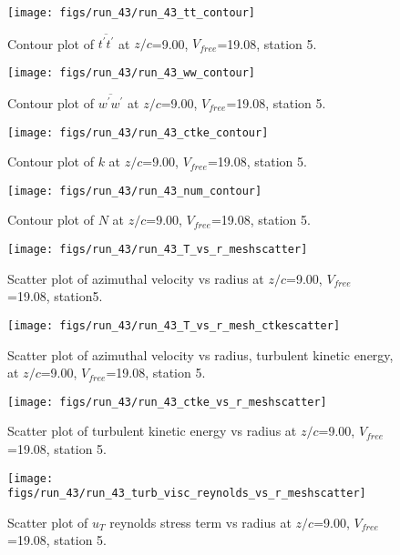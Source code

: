 \begin{figure}[H]
\centering
\texttt{[image: figs/run\_43/run\_43\_tt\_contour]}
\caption{Contour plot of $\overline{t^\prime t^\prime}$ at $z/c$=9.00, $V_{free}$=19.08, station 5.}
\end{figure}


\begin{figure}[H]
\centering
\texttt{[image: figs/run\_43/run\_43\_ww\_contour]}
\caption{Contour plot of $\overline{w^\prime w^\prime}$ at $z/c$=9.00, $V_{free}$=19.08, station 5.}
\end{figure}


\begin{figure}[H]
\centering
\texttt{[image: figs/run\_43/run\_43\_ctke\_contour]}
\caption{Contour plot of $k$ at $z/c$=9.00, $V_{free}$=19.08, station 5.}
\end{figure}


\begin{figure}[H]
\centering
\texttt{[image: figs/run\_43/run\_43\_num\_contour]}
\caption{Contour plot of $N$ at $z/c$=9.00, $V_{free}$=19.08, station 5.}
\end{figure}


\begin{figure}[H]
\centering
\texttt{[image: figs/run\_43/run\_43\_T\_vs\_r\_meshscatter]}
\caption{Scatter plot of azimuthal velocity vs radius at $z/c$=9.00, $V_{free}$=19.08, station5.}
\end{figure}


\begin{figure}[H]
\centering
\texttt{[image: figs/run\_43/run\_43\_T\_vs\_r\_mesh\_ctkescatter]}
\caption{Scatter plot of azimuthal velocity vs radius, turbulent kinetic energy, at $z/c$=9.00, $V_{free}$=19.08, station 5.}
\end{figure}


\begin{figure}[H]
\centering
\texttt{[image: figs/run\_43/run\_43\_ctke\_vs\_r\_meshscatter]}
\caption{Scatter plot of turbulent kinetic energy vs radius at $z/c$=9.00, $V_{free}$=19.08, station 5.}
\end{figure}


\begin{figure}[H]
\centering
\texttt{[image: figs/run\_43/run\_43\_turb\_visc\_reynolds\_vs\_r\_meshscatter]}
\caption{Scatter plot of $
u_T$ reynolds stress term vs radius at $z/c$=9.00, $V_{free}$=19.08, station 5.}
\end{figure}


